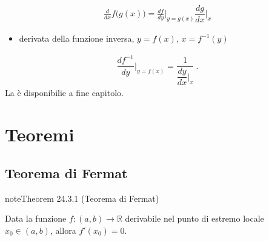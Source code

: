 \documentclass[letterpaper,10pt,italian]{jupyterBook}
\begin{document}
\begin{equation}\label{equation:ch/infinitesimal_calculus/derivatives:infinitesimal-calculus:derivatives:rules:composite}
\begin{split}\frac{d}{dx} f\big( g(x) \big) = \frac{d f}{dy}\Big|_{y=g(x)} \dfrac{d g}{d x}\Big|_{x}\end{split}
\end{equation}\begin{itemize}
\item {} 
\sphinxAtStartPar
derivata della funzione inversa, \(y = f(x)\), \(x = f^{-1}(y)\)

\end{itemize}
\begin{equation}\label{equation:ch/infinitesimal_calculus/derivatives:infinitesimal-calculus:derivatives:rules:inverse}
\begin{split} \dfrac{d f^{-1}}{d y}\bigg|_{y = f(x)} = \dfrac{1}{ \dfrac{d y}{d x}\bigg|_{x}} \ .\end{split}
\end{equation}
\sphinxAtStartPar
La {\hyperref[\detokenize{ch/infinitesimal_calculus/derivatives-notes:infinitesimal-calculus-derivatives-rules-notes}]{}} è disponibilie a fine capitolo.


\section{Teoremi}
\label{\detokenize{ch/infinitesimal_calculus/derivatives:teoremi}}\label{\detokenize{ch/infinitesimal_calculus/derivatives:infinitesimal-calculus-derivatives-thm}}

\subsection{Teorema di Fermat}
\label{\detokenize{ch/infinitesimal_calculus/derivatives:teorema-di-fermat}}\label{\detokenize{ch/infinitesimal_calculus/derivatives:infinitesimal-calculus-derivatives-thm-fermat}}\label{ch/infinitesimal_calculus/derivatives:thm:infinitesimal-calculus:derivatives:thm:fermat}
\begin{sphinxadmonition}{note}{Theorem 24.3.1 (Teorema di Fermat)}



\sphinxAtStartPar
Data la funzione \(f: (a,b) \rightarrow \mathbb{R}\) derivabile nel punto di estremo locale \(x_0 \in (a,b)\), allora \(f'(x_0) = 0\).
\end{sphinxadmonition}
\end{document}
